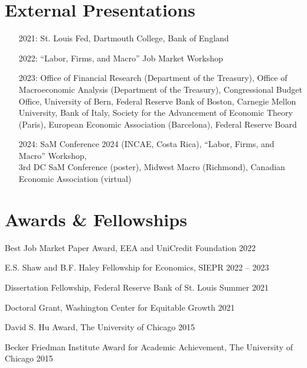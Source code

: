 \documentclass[margin,line]{res}                          %
\newenvironment{list1}{
	\begin{list}{\ding{113}}{%
			\setlength{\itemsep}{0in}
			\setlength{\parsep}{0in} \setlength{\parskip}{0in}
			\setlength{\topsep}{0in} \setlength{\partopsep}{0in}
			\setlength{\leftmargin}{0.17in}}}{\end{list}}
\begin{document}
\begin{resume}
	\section{\sc External Presentations}
	\begin{list1}
		\item[]
		\begin{itemize}\setlength{\itemindent}{.3cm}
			\item[2021:]\makebox[0.1cm]{\hfill} St. Louis Fed, Dartmouth College, Bank of England\smallskip
			\item[2022:]\makebox[0.1cm]{\hfill} ``Labor, Firms, and Macro'' Job Market Workshop \smallskip
			\item[2023:]\makebox[0.1cm]{\hfill} Office of Financial Research (Department of the Treasury), Office of Macroeconomic \hspace*{0.55cm}Analysis (Department of the Treasury), Congressional Budget Office, University of Bern, \hspace*{0.55cm}Federal Reserve Bank of Boston, Carnegie Mellon University, Bank of Italy,  Society for \hspace*{0.55cm}the Advancement of Economic Theory (Paris), European Economic Association (Barcelona),
			\hspace*{0.55cm}Federal Reserve Board\smallskip
			\item[2024:]\makebox[0.1cm]{\hfill} SaM Conference 2024 (INCAE, Costa Rica), ``Labor, Firms, and Macro'' Workshop,\\ 
			\hspace*{0.55cm}3rd DC SaM Conference (poster), Midwest Macro (Richmond), Canadian Economic
			\hspace*{0.55cm}Association (virtual)
		\end{itemize}		
	\end{list1}


	\section{\sc Awards \& Fellowships}
	\begin{list1}
		\item[] Best Job Market Paper Award, EEA and UniCredit Foundation
		\hfill 2022\smallskip
		\item[] E.S. Shaw and B.F. Haley Fellowship for Economics, SIEPR \hfill 2022 -- 2023\smallskip
		\item[] Dissertation Fellowship, Federal Reserve Bank of St. Louis  \hfill Summer 2021\smallskip
		\item[] Doctoral Grant, Washington Center for Equitable Growth \hfill 2021\smallskip
		\item[] David S. Hu Award, The University of Chicago \hfill 2015\smallskip
		\item[] Becker Friedman Institute Award for Academic Achievement, The University of Chicago \hfill 2015\smallskip
	\end{list1}
	

\end{resume}
\end{document}
